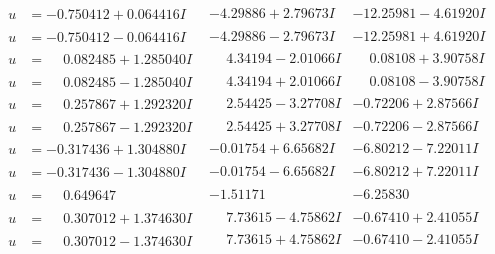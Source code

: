 \documentclass[1p]{elsarticle_modified}
\theoremstyle{definition}
\begin{document}
$$\begin{array}{c|c|c}
\begin{aligned}
u &= -0.750412 + 0.064416 I\end{aligned}
 & -4.29886 + 2.79673 I & -12.25981 - 4.61920 I \\ \hline\begin{aligned}
u &= -0.750412 - 0.064416 I\end{aligned}
 & -4.29886 - 2.79673 I & -12.25981 + 4.61920 I \\ \hline\begin{aligned}
u &= \phantom{-}0.082485 + 1.285040 I\end{aligned}
 & \phantom{-}4.34194 - 2.01066 I & \phantom{-}0.08108 + 3.90758 I \\ \hline\begin{aligned}
u &= \phantom{-}0.082485 - 1.285040 I\end{aligned}
 & \phantom{-}4.34194 + 2.01066 I & \phantom{-}0.08108 - 3.90758 I \\ \hline\begin{aligned}
u &= \phantom{-}0.257867 + 1.292320 I\end{aligned}
 & \phantom{-}2.54425 - 3.27708 I & -0.72206 + 2.87566 I \\ \hline\begin{aligned}
u &= \phantom{-}0.257867 - 1.292320 I\end{aligned}
 & \phantom{-}2.54425 + 3.27708 I & -0.72206 - 2.87566 I \\ \hline\begin{aligned}
u &= -0.317436 + 1.304880 I\end{aligned}
 & -0.01754 + 6.65682 I & -6.80212 - 7.22011 I \\ \hline\begin{aligned}
u &= -0.317436 - 1.304880 I\end{aligned}
 & -0.01754 - 6.65682 I & -6.80212 + 7.22011 I \\ \hline\begin{aligned}
u &= \phantom{-}0.649647\phantom{ +0.000000I}\end{aligned}
 & -1.51171\phantom{ +0.000000I} & -6.25830\phantom{ +0.000000I} \\ \hline\begin{aligned}
u &= \phantom{-}0.307012 + 1.374630 I\end{aligned}
 & \phantom{-}7.73615 - 4.75862 I & -0.67410 + 2.41055 I \\ \hline\begin{aligned}
u &= \phantom{-}0.307012 - 1.374630 I\end{aligned}
 & \phantom{-}7.73615 + 4.75862 I & -0.67410 - 2.41055 I \\ \hline\begin{aligned}

\end{aligned}
\end{array}$$
\end{document}
